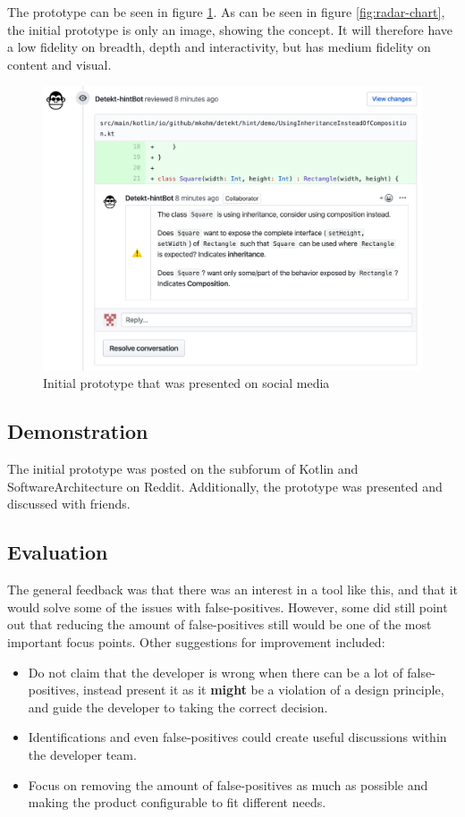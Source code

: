 \documentclass{report}
\begin{document}
The prototype can be seen in figure \ref{fig:mockup}. As can be seen in figure \ref{fig:radar-chart}, the initial prototype is only an image, showing the concept. It will therefore have a low fidelity on breadth, depth and interactivity, but has medium fidelity on content and visual. 


\begin{figure}[h!]
    \centering
    \includegraphics[width=\textwidth]{../images/demo.png}
    \caption{Initial prototype that was presented on social media}
    \label{fig:mockup}
\end{figure}

\subsection*{Demonstration}
The initial prototype was posted on the subforum of Kotlin\cite{kotlin-reddit} and SoftwareArchitecture\cite{softwarearch-reddit} on Reddit. Additionally, the prototype was presented and discussed with friends. 

\subsection*{Evaluation}

The general feedback was that there was an interest in a tool like this, and that it would solve some of the issues with false-positives. However, some did still point out that reducing the amount of false-positives still would be one of the most important focus points. Other suggestions for improvement included: 
\begin{itemize}
    \item Do not claim that the developer is wrong when there can be a lot of false-positives, instead present it as it \textbf{might} be a violation of a design principle, and guide the developer to taking the correct decision.
    \item Identifications and even false-positives could create useful discussions within the developer team.
    \item Focus on removing the amount of false-positives as much as possible and making the product configurable to fit different needs.
\end{itemize}
\end{document}
